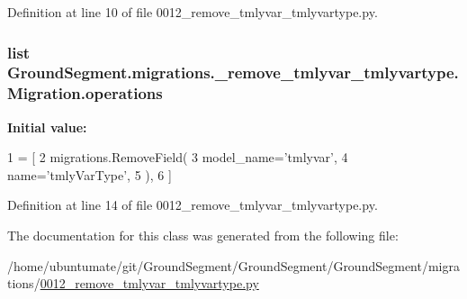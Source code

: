 Definition at line 10 of file 0012\+\_\+remove\+\_\+tmlyvar\+\_\+tmlyvartype.\+py.

\hypertarget{class_ground_segment_1_1migrations_1_10012__remove__tmlyvar__tmlyvartype_1_1_migration_a2fa6b18893856ca5bfaf50936d6baa0f}{}
\subsubsection[{operations}]{\setlength{\rightskip}{0pt plus 5cm}list Ground\+Segment.\+migrations.\+\_\+remove\+\_\+tmlyvar\+\_\+tmlyvartype.\+Migration.\+operations\hspace{0.3cm}{\ttfamily [static]}}\label{class_ground_segment_1_1migrations_1_10012__remove__tmlyvar__tmlyvartype_1_1_migration_a2fa6b18893856ca5bfaf50936d6baa0f}
{\bfseries Initial value\+:}
\begin{DoxyCode}
1 = [
2         migrations.RemoveField(
3             model\_name=\textcolor{stringliteral}{'tmlyvar'},
4             name=\textcolor{stringliteral}{'tmlyVarType'},
5         ),
6     ]
\end{DoxyCode}


Definition at line 14 of file 0012\+\_\+remove\+\_\+tmlyvar\+\_\+tmlyvartype.\+py.



The documentation for this class was generated from the following file\+:\begin{DoxyCompactItemize}
\item 
/home/ubuntumate/git/\+Ground\+Segment/\+Ground\+Segment/\+Ground\+Segment/migrations/\hyperlink{0012__remove__tmlyvar__tmlyvartype_8py}{0012\+\_\+remove\+\_\+tmlyvar\+\_\+tmlyvartype.\+py}\end{DoxyCompactItemize}
